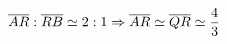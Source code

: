 \documentclass[preview]{standalone}
\begin{document}
\begin{align*}
\overline{AR} : \overline{RB}  \simeq 2 : 1 \Rightarrow \overline{AR} \simeq \overline{QR} \simeq {4 \over 3}
\end{align*}
\end{document}
